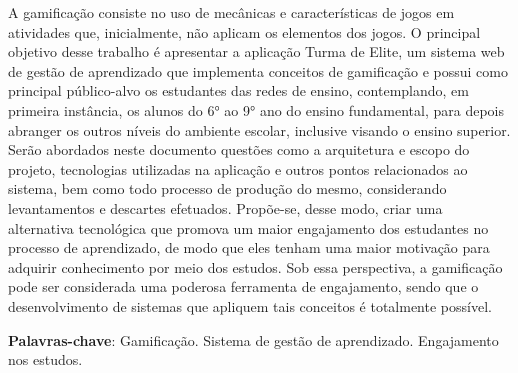 \setlength{\absparsep}{18pt} %
\begin{resumo}

 \vspace{\onelineskip}

 A gamificação consiste no uso de mecânicas e características de jogos em atividades que, inicialmente, não aplicam os elementos dos jogos. O principal objetivo desse trabalho é apresentar a aplicação Turma de Elite, um sistema web de gestão de aprendizado que implementa conceitos de gamificação e possui como principal público-alvo os estudantes das redes de ensino, contemplando, em primeira instância, os alunos do 6° ao 9° ano do ensino fundamental, para depois abranger os outros níveis do ambiente escolar, inclusive visando o ensino superior. Serão abordados neste documento questões como a arquitetura e escopo do projeto, tecnologias utilizadas na aplicação e outros pontos relacionados ao sistema, bem como todo processo de produção do mesmo, considerando levantamentos e descartes efetuados. 
 Propõe-se, desse modo, criar uma alternativa tecnológica que promova um maior engajamento dos estudantes no processo de aprendizado, de modo que eles tenham uma maior motivação para adquirir conhecimento por meio dos estudos. Sob essa perspectiva, a gamificação pode ser considerada uma poderosa ferramenta de engajamento, sendo que o desenvolvimento de sistemas que apliquem tais conceitos é totalmente possível.
 
 \vspace{\onelineskip}
 
 \textbf{Palavras-chave}: Gamificação. Sistema de gestão de aprendizado. Engajamento nos estudos.
 
\end{resumo}

